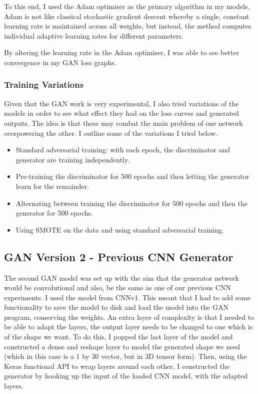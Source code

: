 \documentclass[12pt,a4paper,twoside]{report}
\begin{document}
To this end, I used the Adam optimiser as the primary algorithm in my models. Adam is not like classical stochastic gradient descent whereby a single, constant learning rate is maintained across all weights, but instead, the method computes individual adaptive learning rates for different parameters.

By altering the learning rate in the Adam optimiser, I was able to see better convergence in my GAN loss graphs. 

\subsubsection{Training Variations}

Given that the GAN work is very experimental, I also tried variations of the models in order to see what effect they had on the loss curves and generated outputs. The idea is that these may combat the main problem of one network overpowering the other. I outline some of the variations I tried below.

\begin{itemize}
\item Standard adversarial training: with each epoch, the discriminator and generator are training independently. 
\item Pre-training the discriminator for 500 epochs and then letting the generator learn for the remainder.
\item Alternating between training the discriminator for 500 epochs and then the generator for 500 epochs.
\item Using SMOTE on the data and using standard adversarial training.
\end{itemize}

\subsection{GAN Version 2 - Previous CNN Generator}

The second GAN model was set up with the aim that the generator network would be convolutional and also, be the same as one of our previous CNN experiments. I used the model from CNNv1. This meant that I had to add some functionality to save the model to disk and load the model into the GAN program, conserving the weights. An extra layer of complexity is that I needed to be able to adapt the layers, the output layer needs to be changed to one which is of the shape we want. To do this, I popped the last layer of the model and constructed a dense and reshape layer to model the generated shape we need (which in this case is a 1 by 30 vector, but in 3D tensor form). Then, using the Keras functional API to wrap layers around each other, I constructed the generator by hooking up the input of the loaded CNN model, with the adapted layers. 
\end{document}
